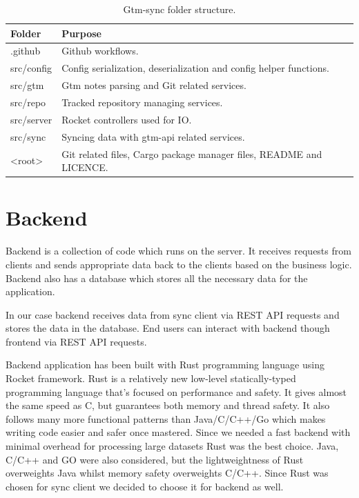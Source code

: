 \begin{table}[h]
    \centering
    \begin{tabular}{ | p{3cm} | p{10cm} |}
        \hline
        \textbf{Folder} & \textbf{Purpose}\\
        \hline
        .github & Github workflows.\\
        \hline
        src/config & Config serialization, deserialization and config helper functions.\\
        \hline
        src/gtm & Gtm notes parsing and Git related services.\\
        \hline
        src/repo & Tracked repository managing services.\\
        \hline
        src/server & Rocket controllers used for IO.\\
        \hline
        src/sync & Syncing data with gtm-api related services.\\
        \hline
        <root> & Git related files, Cargo package manager files, README and LICENCE.\\
        \hline
    \end{tabular}
    \caption{Gtm-sync folder structure.}
    \label{tab:gtm-sync-folder-structure}
\end{table}

\section{Backend}\label{sec:backend}
Backend is a collection of code which runs on the server.
It receives requests from clients and sends appropriate data back to the clients based on the business logic.
Backend also has a database which stores all the necessary data for the application.

In our case backend receives data from sync client via REST API requests and stores the data in the database.
End users can interact with backend though frontend via REST API requests.

Backend application has been built with Rust programming language using Rocket framework.
Rust is a relatively new low-level statically-typed programming language that's focused on performance and safety.
It gives almost the same speed as C, but guarantees both memory and thread safety.
It also follows many more functional patterns than Java/C/C++/Go which makes writing code easier and safer once mastered.
Since we needed a fast backend with minimal overhead for processing large datasets Rust was the best choice.
Java, C/C++ and GO were also considered, but the lightweightness of Rust overweights Java whilst memory safety overweights C/C++.
Since Rust was chosen for sync client we decided to choose it for backend as well.

